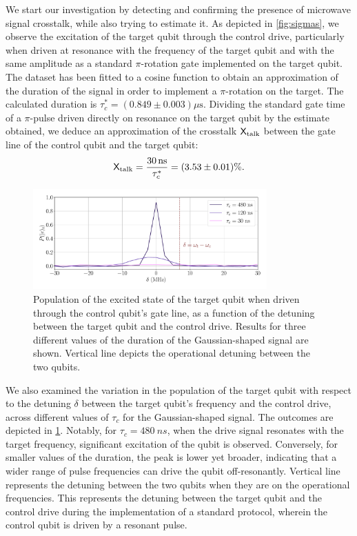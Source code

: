We start our investigation by detecting and confirming the presence of microwave signal crosstalk, while also trying to estimate it.
As depicted in \cref{fig:sigmas}, we observe the excitation of the target qubit through the control drive, particularly when driven at resonance with the frequency of the target qubit and with the same amplitude as a standard $\pi$-rotation gate implemented on the target qubit.
The dataset has been fitted to a cosine function to obtain an approximation of the duration of the signal in order to implement a $\pi$-rotation on the target.
The calculated duration is $\tau_c^* = (0.849 \pm 0.003) \mu \text{s}$.
Dividing the standard gate time of a $\pi$-pulse driven directly on resonance on the target qubit by the estimate obtained, we deduce an approximation of the crosstalk $\mathsf{X}_{\text{talk}}$ between the gate line of the control qubit and the target qubit:
\begin{equation}
\mathsf{X}_{\text{talk}} = \frac{\SI{30}{ns}}{\tau_c^*} = (3.53 \pm 0.01) \% .
\end{equation}

\begin{figure}
    \centering
    \includegraphics[width=0.8\textwidth]{Images//Chap2.0/detunings.pdf}
    \caption{Population of the excited state of the target qubit when driven through the control qubit's gate line, as a function of the detuning between the target qubit and the control drive. Results for three different values of the duration of the Gaussian-shaped signal are shown. Vertical line depicts the operational detuning between the two qubits.}
    \label{fig:detunings}
\end{figure}

We also examined the variation in the population of the target qubit with respect to the detuning $\delta$ between the target qubit's frequency and the control drive, across different values of $\tau_c$ for the Gaussian-shaped signal. 
The outcomes are depicted in \cref{fig:detunings}.
Notably, for $\tau_c = \SI{480}{ns}$, when the drive signal resonates with the target frequency, significant excitation of the qubit is observed.
Conversely, for smaller values of the duration, the peak is lower yet broader, indicating that a wider range of pulse frequencies can drive the qubit off-resonantly.
Vertical line represents the detuning between the two qubits when they are on the operational frequencies.
This represents the detuning between the target qubit and the control drive during the implementation of a standard protocol, wherein the control qubit is driven by a resonant pulse.

